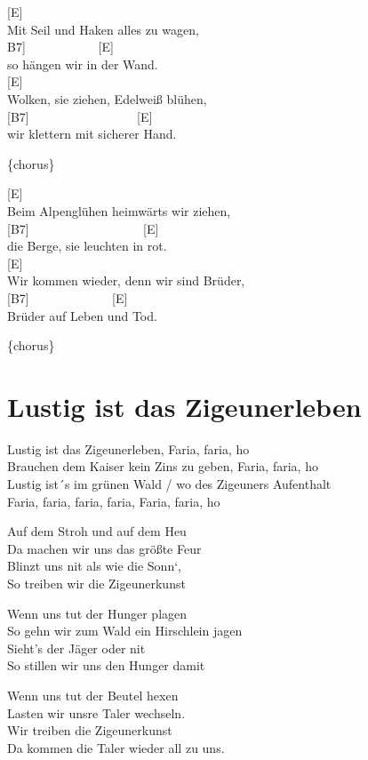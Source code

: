 \documentclass[
  letterpaper,
  twoside=false]{scrbook}
\begin{document}
{[}E{]} ~ ~ ~\\
Mit Seil und Haken alles zu wagen,\\
\hspace*{0.333em}{[}B7{]} ~ ~ ~ ~ ~ ~ ~{[}E{]}\\
so hängen wir in der Wand.\\
{[}E{]} ~ ~\\
Wolken, sie ziehen, Edelweiß blühen,\\
{[}B7{]} ~ ~ ~ ~ ~ ~ ~ ~ ~ ~ {[}E{]}\\
wir klettern mit sicherer Hand.

\{chorus\}

{[}E{]}\\
Beim Alpenglühen heimwärts wir ziehen,\\
{[}B7{]} ~ ~ ~ ~ ~ ~ ~ ~ ~ ~ ~{[}E{]}\\
die Berge, sie leuchten in rot.\\
{[}E{]} ~ ~ ~ ~ ~ ~ ~ ~ ~\\
Wir kommen wieder, denn wir sind Brüder,\\
{[}B7{]} ~ ~ ~ ~ ~ ~ ~ ~{[}E{]}\\
Brüder auf Leben und Tod.

\{chorus\}

\hypertarget{lustig-ist-das-zigeunerleben}{%
\chapter{Lustig ist das
Zigeunerleben}\label{lustig-ist-das-zigeunerleben}}

Lustig ist das Zigeunerleben, Faria, faria, ho\\
Brauchen dem Kaiser kein Zins zu geben, Faria, faria, ho\\
Lustig ist´s im grünen Wald / wo des Zigeuners Aufenthalt\\
Faria, faria, faria, faria, Faria, faria, ho

Auf dem Stroh und auf dem Heu\\
Da machen wir uns das größte Feur\\
Blinzt uns nit als wie die Sonn`,\\
So treiben wir die Zigeunerkunst

Wenn uns tut der Hunger plagen\\
So gehn wir zum Wald ein Hirschlein jagen\\
Sieht's der Jäger oder nit\\
So stillen wir uns den Hunger damit

Wenn uns tut der Beutel hexen\\
Lasten wir unsre Taler wechseln.\\
Wir treiben die Zigeunerkunst\\
Da kommen die Taler wieder all zu uns.
\end{document}

